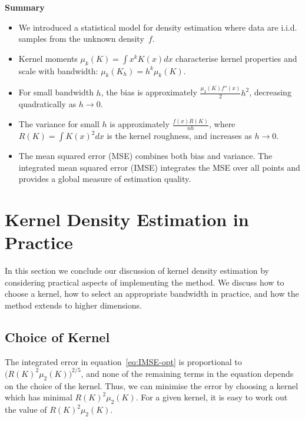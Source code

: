 \documentclass[
  a4paper,
]{article}
\providecommand{\tightlist}{%
  \setlength{\itemsep}{0pt}\setlength{\parskip}{0pt}}
\theoremstyle{definition}
\theoremstyle{definition}
\theoremstyle{definition}
\theoremstyle{definition}
\theoremstyle{remark}
\begin{document}
\textbf{Summary}

\begin{itemize}
\tightlist
\item
  We introduced a statistical model for density estimation where data are
  i.i.d. samples from the unknown density~\(f\).
\item
  Kernel moments \(\mu_k(K) = \int x^k K(x) dx\) characterise kernel properties
  and scale with bandwidth: \(\mu_k(K_h) = h^k \mu_k(K)\).
\item
  For small bandwidth \(h\), the bias is approximately
  \(\frac{\mu_2(K) f''(x)}{2} h^2\), decreasing quadratically as \(h \to 0\).
\item
  The variance for small \(h\) is approximately \(\frac{f(x) R(K)}{nh}\),
  where \(R(K) = \int K(x)^2 dx\) is the kernel roughness, and increases
  as \(h \to 0\).
\item
  The mean squared error (MSE) combines both bias and variance. The integrated
  mean squared error (IMSE) integrates the MSE over all points and provides a
  global measure of estimation quality.
\end{itemize}

\clearpage

\section{Kernel Density Estimation in Practice}\label{X03-practice}

In this section we conclude our discussion of kernel density estimation
by considering practical aspects of implementing the method. We discuss
how to choose a kernel, how to select an appropriate bandwidth in practice,
and how the method extends to higher dimensions.

\subsection{Choice of Kernel}\label{choice-of-kernel}

The integrated error in equation~\eqref{eq:IMSE-opt} is proportional to
\(\bigl( R(K)^2 \mu_2(K) \bigr)^{2/5}\), and none of the remaining terms in
the equation depends on the choice of the kernel. Thus, we can minimise
the error by choosing a kernel which has minimal \(R(K)^2 \mu_2(K)\).
For a given kernel, it is easy to work out the value of \(R(K)^2 \mu_2(K)\).
\end{document}
